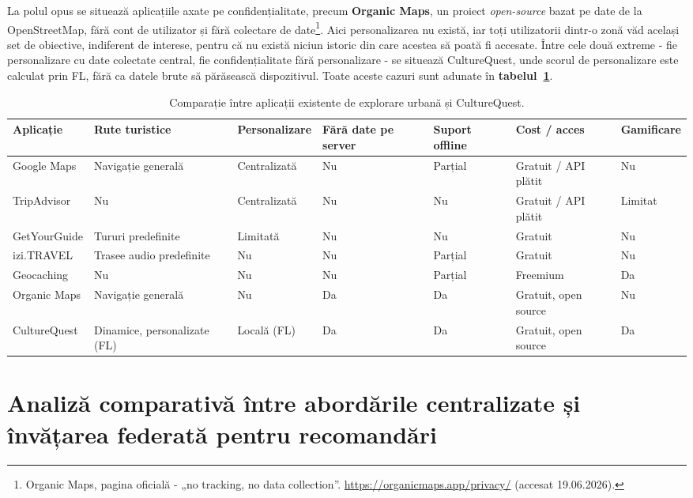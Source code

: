 \documentclass[12pt,a4paper]{report}
\begin{document}
La polul opus se situează aplicațiile axate pe confidențialitate, precum \textbf{Organic Maps}, un proiect \textit{open-source} bazat pe date de la OpenStreetMap, fără cont de utilizator și fără colectare de date\footnote{Organic Maps, pagina oficială - „no tracking, no data collection”. \url{https://organicmaps.app/privacy/} (accesat 19.06.2026).}. Aici personalizarea nu există, iar toți utilizatorii dintr-o zonă văd același set de obiective, indiferent de interese, pentru că nu există niciun istoric din care acestea să poată fi accesate. Între cele două extreme - fie personalizare cu date colectate central, fie confidențialitate fără personalizare - se situează CultureQuest, unde scorul de personalizare este calculat prin FL, fără ca datele brute să părăsească dispozitivul. Toate aceste cazuri sunt adunate în \textbf{tabelul~\ref{tab:apps-comparativ}}.

\begin{table}[h]
\centering
\scriptsize
\caption{Comparație între aplicații existente de explorare urbană și CultureQuest.}
\label{tab:apps-comparativ}
\begin{tabular}{|p{1.9cm}|p{2.2cm}|p{2.2cm}|p{1.9cm}|p{1.4cm}|p{1.6cm}|p{1.4cm}|}
\hline
\textbf{Aplicație} & \textbf{Rute turistice} & \textbf{Personalizare} & \textbf{Fără date pe server} & \textbf{Suport offline} & \textbf{Cost / acces} & \textbf{Gamificare} \\
\hline
Google Maps & Navigație generală & Centralizată & Nu & Parțial & Gratuit / API plătit & Nu \\
\hline
TripAdvisor & Nu & Centralizată & Nu & Nu & Gratuit / API plătit & Limitat \\
\hline
GetYourGuide & Tururi predefinite & Limitată & Nu & Nu & Gratuit & Nu \\
\hline
izi.TRAVEL & Trasee audio predefinite & Nu & Nu & Parțial & Gratuit & Nu \\
\hline
Geocaching & Nu & Nu & Nu & Parțial & Freemium & Da \\
\hline
Organic Maps & Navigație generală & Nu & Da & Da & Gratuit, open source & Nu \\
\hline
CultureQuest & Dinamice, personalizate (FL) & Locală (FL) & Da & Da & Gratuit, open source & Da \\
\hline
\end{tabular}
\end{table}

\section{Analiză comparativă între abordările centralizate și învățarea federată pentru recomandări}
\end{document}
